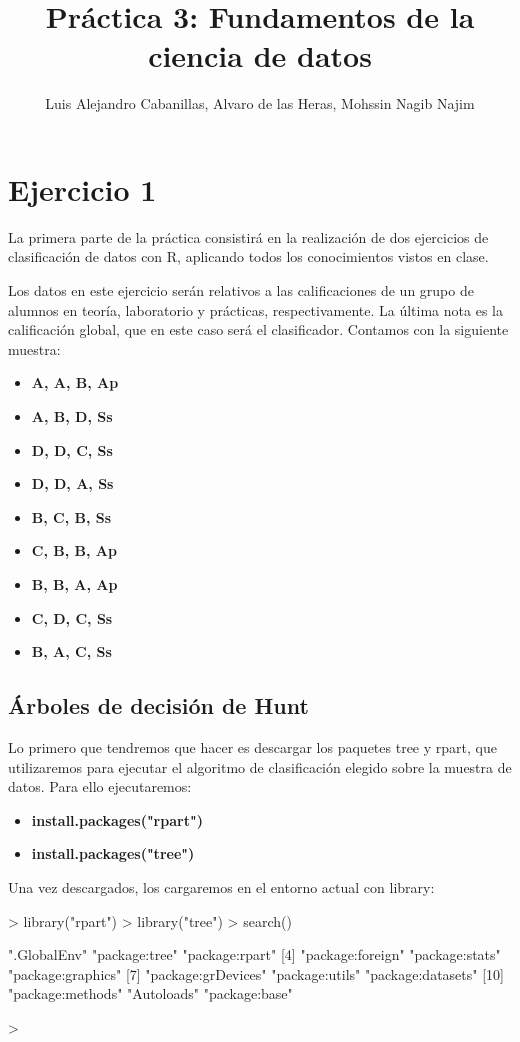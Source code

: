 \documentclass[a4paper]{article}
\title{\textbf{Práctica 3: Fundamentos de la ciencia de datos}}
\author{Luis Alejandro Cabanillas, Alvaro de las Heras, Mohssin Nagib Najim}
\begin{document}



\maketitle

\section{Ejercicio 1}La primera parte de la práctica consistirá en la realización de dos ejercicios de clasificación de datos con R, aplicando todos los conocimientos vistos en clase.

Los datos en este ejercicio serán relativos a las calificaciones de un grupo de alumnos en teoría, laboratorio y prácticas, respectivamente. La última nota es la calificación global, que en este caso será el clasificador. Contamos con la siguiente muestra:
\begin{itemize}
	\item \textbf{{A, A, B, Ap}}
	\item \textbf{{A, B, D, Ss}}
	\item \textbf{{D, D, C, Ss}}
        \item \textbf{{D, D, A, Ss}}
        \item \textbf{{B, C, B, Ss}}
        \item \textbf{{C, B, B, Ap}}
        \item \textbf{{B, B, A, Ap}}
        \item \textbf{{C, D, C, Ss}}
        \item \textbf{{B, A, C, Ss}}
\end{itemize}

\subsection{Árboles de decisión de Hunt} Lo primero que tendremos que hacer es descargar los paquetes tree y rpart, que utilizaremos para ejecutar el algoritmo de clasificación elegido sobre la muestra de datos. Para ello ejecutaremos:

\begin{itemize}
	\item \textbf{{install.packages("rpart")}}
	\item \textbf{{install.packages("tree")}}
\end{itemize}

Una vez descargados, los cargaremos en el entorno actual con library:
\begin{Schunk}
\begin{Sinput}
> library("rpart")
> library("tree")
> search()
\end{Sinput}
\begin{Soutput}
 [1] ".GlobalEnv"        "package:tree"      "package:rpart"    
 [4] "package:foreign"   "package:stats"     "package:graphics" 
 [7] "package:grDevices" "package:utils"     "package:datasets" 
[10] "package:methods"   "Autoloads"         "package:base"     
\end{Soutput}
\begin{Sinput}
> 
\end{Sinput}
\end{Schunk}
\end{document}
